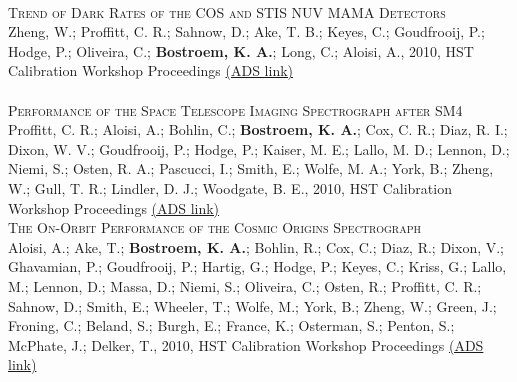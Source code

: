 \\
\textsc{Trend of Dark Rates of the COS and STIS NUV MAMA Detectors}\\ 
Zheng, W.; Proffitt, C. R.; Sahnow, D.; Ake, T. B.; Keyes, C.; Goudfrooij, P.; Hodge, P.; Oliveira, C.; \textbf{Bostroem, K. A.}; Long, C.; Aloisi, A., 2010, HST Calibration Workshop Proceedings 
\color{blue}\href{https://ui.adsabs.harvard.edu/#abs/2010hstc.workE..47Z/abstract}{(ADS link)}\color{black}\\
\\
\textsc{Performance of the Space Telescope Imaging Spectrograph after SM4}\\
Proffitt, C. R.; Aloisi, A.; Bohlin, C.; \textbf{Bostroem, K. A.}; Cox, C. R.; Diaz, R. I.; Dixon, W. V.; Goudfrooij, P.; Hodge, P.; Kaiser, M. E.; Lallo, M. D.; Lennon, D.; Niemi, S.; Osten, R. A.; Pascucci, I.; Smith, E.; Wolfe, M. A.; York, B.; Zheng, W.; Gull, T. R.; Lindler, D. J.; Woodgate, B. E., 2010, HST Calibration Workshop Proceedings
\color{blue}\href{https://ui.adsabs.harvard.edu/#abs/2010hstc.workE...6P/abstract}{(ADS link)}\color{black}\\
\textsc{The On-Orbit Performance of the Cosmic Origins Spectrograph}\\
Aloisi, A.; Ake, T.; \textbf{Bostroem, K. A.}; Bohlin, R.; Cox, C.; Diaz, R.; Dixon, V.; Ghavamian, P.; Goudfrooij, P.; Hartig, G.; Hodge, P.; Keyes, C.; Kriss, G.; Lallo, M.; Lennon, D.; Massa, D.; Niemi, S.; Oliveira, C.; Osten, R.; Proffitt, C. R.; Sahnow, D.; Smith, E.; Wheeler, T.; Wolfe, M.; York, B.; Zheng, W.; Green, J.; Froning, C.; Beland, S.; Burgh, E.; France, K.; Osterman, S.; Penton, S.; McPhate, J.; Delker, T., 2010, HST Calibration Workshop Proceedings 
\color{blue}\href{https://ui.adsabs.harvard.edu/#abs/2010hstc.workE...3A/abstract}{(ADS link)}\color{black}\\
